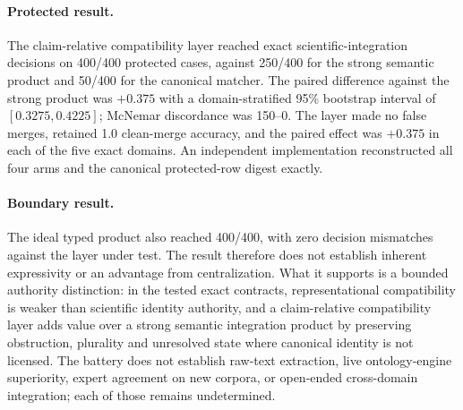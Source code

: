 \paragraph{Protected result.}
The claim-relative compatibility layer reached exact scientific-integration
decisions on 400/400 protected cases, against 250/400 for the strong semantic
product and 50/400 for the canonical matcher. The paired difference against
the strong product was $+0.375$ with a domain-stratified 95\% bootstrap
interval of $[0.3275,0.4225]$; McNemar discordance was 150--0. The layer made
no false merges, retained 1.0 clean-merge accuracy, and the paired effect was
$+0.375$ in each of the five exact domains. An independent implementation
reconstructed all four arms and the canonical protected-row digest exactly.

\paragraph{Boundary result.}
The ideal typed product also reached 400/400, with zero decision mismatches
against the layer under test. The result therefore does not establish inherent
expressivity or an advantage from centralization. What it supports is a
bounded authority distinction: in the tested exact contracts, representational
compatibility is weaker than scientific identity authority, and a
claim-relative compatibility layer adds value over a strong semantic
integration product by preserving obstruction, plurality and unresolved state
where canonical identity is not licensed. The battery does not establish
raw-text extraction, live ontology-engine superiority, expert agreement on new
corpora, or open-ended cross-domain integration; each of those remains
undetermined.
\endinput
